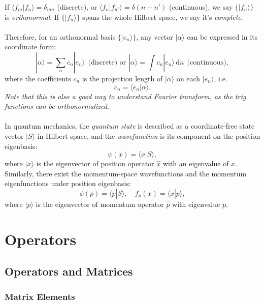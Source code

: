 	If $\langle f_m | f_n \rangle = \delta_{mn}$ (discrete), 
	or $\langle f_n | f_{n'} \rangle = \delta(n-n')$ (continuous), 
	we say $\{|f_n\rangle\}$ is \emph{orthonormal}. 
	If $\{|f_n\rangle\}$ spans the whole Hilbert space, we say it's \emph{complete}.\\ \\
	Therefore, for an orthonormal basis $\{|e_n\rangle\}$, any vector $|\alpha\rangle$ can be expressed in its coordinate form:
	\[|\alpha\rangle = \sum_{n}c_n|e_n\rangle\ \ \text{(discrete) or }|\alpha\rangle = \int\! c_n|e_n\rangle\,\text{d}n \ \ \text{(continuous)},\]
	where the coefficients $c_n$ is the projection length of $|\alpha\rangle$ on each $|e_n\rangle$, i.e.
	\[c_n = \langle e_n | \alpha \rangle.\]
	\emph{Note that this is also a good way to understand Fourier transform, as the trig functions can be orthonormalized.}\\ \\
	In quantum mechanics, the \emph{quantum state} is described as a coordinate-free state vector $|S\rangle$ in Hilbert space, 
	and the \emph{wavefunction} is its component on the position eigenbasis:
	\[\psi(x) = \langle x | S \rangle,\]\label{1.1}
	where $|x\rangle$ is the eigenvector of position operator $\hat{x}$ with an eigenvalue of $x$.\\
	Similarly, there exist the momentum-space wavefunctions and the momentum eigenfunctions under position eigenbasis:
	\[\phi(p) = \langle p | S \rangle, \quad f_p(x) = \langle x | p \rangle,\]
	where $|p\rangle$ is the eigenvector of momentum operator $\hat{p}$ with eigenvalue $p$.\\
	
	\section{Operators}
	\subsection{Operators and Matrices}
	\subsubsection{Matrix Elements}\label{matrix element}
	
